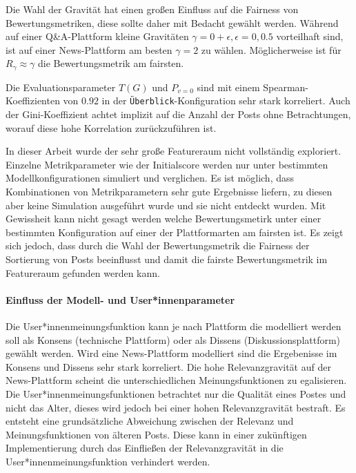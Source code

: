 Die Wahl der Gravität hat einen großen Einfluss auf die Fairness von Bewertungsmetriken, diese sollte daher mit Bedacht gewählt werden. Während auf einer Q\&A-Plattform kleine Gravitäten $\gamma = 0 + \epsilon, \epsilon = {0, 0.5}$ vorteilhaft sind, ist auf einer News-Plattform am besten $\gamma = 2$ zu wählen. Möglicherweise ist für $R_\gamma \approx \gamma$ die Bewertungsmetrik am fairsten.

Die Evaluationsparameter $T(G)$ und $P_{v=0}$ sind mit einem Spearman-Koeffizienten von $0.92$ in der \texttt{Überblick}-Konfiguration sehr stark korreliert. Auch der Gini-Koeffizient achtet implizit auf die Anzahl der Posts ohne Betrachtungen, worauf diese hohe Korrelation zurückzuführen ist. %

In dieser Arbeit wurde der sehr große Featureraum nicht vollständig exploriert. Einzelne Metrikparameter wie der Initialscore werden nur unter bestimmten Modellkonfigurationen simuliert und verglichen. Es ist möglich, dass Kombinationen von Metrikparametern sehr gute Ergebnisse liefern, zu diesen aber keine Simulation ausgeführt wurde und sie nicht entdeckt wurden. Mit Gewissheit kann nicht gesagt werden welche Bewertungsmetirk unter einer bestimmten Konfiguration auf einer der Plattformarten am fairsten ist. Es zeigt sich jedoch, dass durch die Wahl der Bewertungsmetrik die Fairness der Sortierung von Posts beeinflusst und damit die fairste Bewertungsmetrik im Featureraum gefunden werden kann.


\paragraph{Einfluss der Modell- und User*innenparameter}

Die User*innenmeinungsfunktion kann je nach Plattform die modelliert werden soll als Konsens (technische Plattform) oder als Dissens (Diskussionsplattform) gewählt werden. Wird eine News-Plattform modelliert sind die Ergebenisse im Konsens und Dissens sehr stark korreliert. Die hohe Relevanzgravität auf der News-Plattform scheint die unterschiedlichen Meinungsfunktionen zu egalisieren. Die User*innenmeinungsfunktionen betrachtet nur die Qualität eines Postes und nicht das Alter, dieses wird jedoch bei einer hohen Relevanzgravität bestraft. Es entsteht eine grundsätzliche Abweichung zwischen der Relevanz und Meinungsfunktionen von älteren Posts. Diese kann in einer zukünftigen Implementierung durch das Einfließen der Relevanzgravität in die User*innenmeinungsfunktion verhindert werden.


